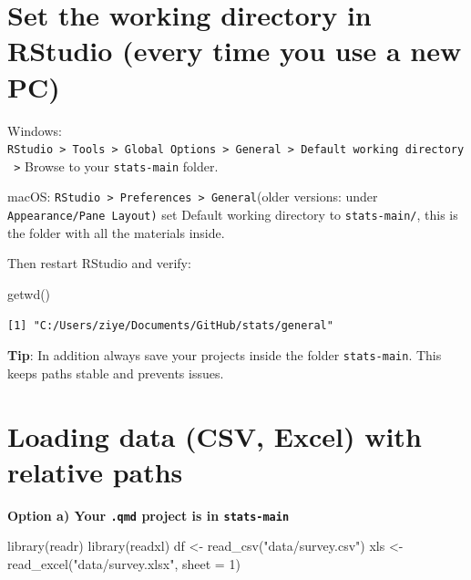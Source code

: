 \documentclass[
  letterpaper,
  DIV=11,
  numbers=noendperiod]{scrreprt}
\newenvironment{Shaded}{\begin{snugshade}}{\end{snugshade}}
\newcommand{\AttributeTok}[1]{\textcolor[rgb]{0.40,0.45,0.13}{#1}}
\newcommand{\DecValTok}[1]{\textcolor[rgb]{0.68,0.00,0.00}{#1}}
\newcommand{\FunctionTok}[1]{\textcolor[rgb]{0.28,0.35,0.67}{#1}}
\newcommand{\NormalTok}[1]{\textcolor[rgb]{0.00,0.23,0.31}{#1}}
\newcommand{\OtherTok}[1]{\textcolor[rgb]{0.00,0.23,0.31}{#1}}
\newcommand{\StringTok}[1]{\textcolor[rgb]{0.13,0.47,0.30}{#1}}
\begin{document}
\section*{Set the working directory in RStudio (every time you use a new
PC)}\label{set-the-working-directory-in-rstudio-every-time-you-use-a-new-pc}


Windows:
\texttt{RStudio\ \textgreater{}\ Tools\ \textgreater{}\ Global\ Options\ \textgreater{}\ General\ \textgreater{}\ Default\ working\ directory\ \textgreater{}}
Browse to your \texttt{stats-main} folder.

macOS:
\texttt{RStudio\ \textgreater{}\ Preferences\ \textgreater{}\ General}(older
versions: under \texttt{Appearance/Pane\ Layout)} set Default working
directory to \texttt{stats-main/}, this is the folder with all the
materials inside.

Then restart RStudio and verify:

\begin{Shaded}
\begin{Highlighting}[]
\FunctionTok{getwd}\NormalTok{()}
\end{Highlighting}
\end{Shaded}

\begin{verbatim}
[1] "C:/Users/ziye/Documents/GitHub/stats/general"
\end{verbatim}

\textbf{Tip}: In addition always save your projects inside the folder
\texttt{stats-main}. This keeps paths stable and prevents issues.

\section*{Loading data (CSV, Excel) with relative
paths}\label{loading-data-csv-excel-with-relative-paths}


\textbf{Option a) Your \texttt{.qmd} project is in \texttt{stats-main}}

\begin{Shaded}
\begin{Highlighting}[]
\FunctionTok{library}\NormalTok{(readr)}
\FunctionTok{library}\NormalTok{(readxl)}
\NormalTok{df }\OtherTok{\textless{}{-}} \FunctionTok{read\_csv}\NormalTok{(}\StringTok{"data/survey.csv"}\NormalTok{)}
\NormalTok{xls }\OtherTok{\textless{}{-}} \FunctionTok{read\_excel}\NormalTok{(}\StringTok{"data/survey.xlsx"}\NormalTok{, }\AttributeTok{sheet =} \DecValTok{1}\NormalTok{)}
\end{Highlighting}
\end{Shaded}
\end{document}
